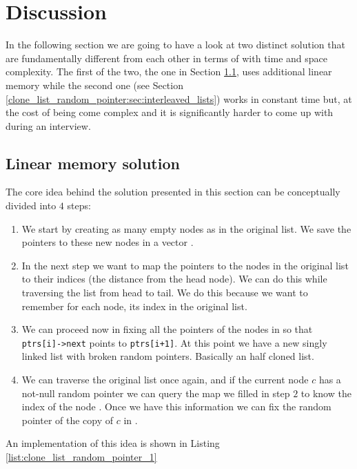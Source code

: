 \section{Discussion}
\label{clone_list_random_pointer:sec:discussion}
In the following section we are going to have a look at two distinct solution that are fundamentally different from each other in terms of with time and space complexity.
The first of the two, the one in Section \ref{clone_list_random_pointer:sec:bruteforce}, uses additional linear memory while the second one (see Section \ref{clone_list_random_pointer:sec:interleaved_lists}) works in constant time but, at the cost of being come complex and it is significantly harder to come up with during an interview.

\subsection{Linear memory solution}
\label{clone_list_random_pointer:sec:bruteforce}
The core idea behind the solution presented in this section can be conceptually divided into $4$ steps:
\begin{enumerate}
	\item We start by creating as many empty nodes as in the original list. We save the pointers to these new nodes in a vector .
	\item In the next step we want to map the pointers to the nodes in the original list to their indices (the distance from the head node). 
	We can do this while traversing the list from head to tail. 
	We do this because we want to remember for each node, its index  in the original list. 
	\item We can proceed now in fixing all the  pointers of the nodes in  so that \lstinline[columns=fixed]{ptrs[i]->next} points to  \lstinline[columns=fixed]{ptrs[i+1]}. At this point we have a new singly linked list with broken random pointers. Basically an half cloned list.
	\item We can traverse the original list once again, and if the current node $c$ has a not-null random pointer  we can query the map we filled in step $2$ to know the index of the node . Once we have this information we can fix the random pointer of the copy of $c$ in .
\end{enumerate}
An implementation of this idea is shown in  Listing \ref{list:clone_list_random_pointer_1}


